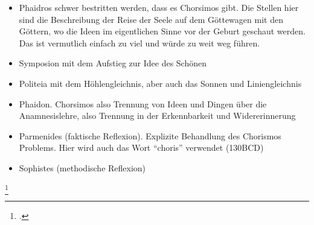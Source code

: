 \documentclass[12pt]{article}
\begin{document}
\begin{itemize}
    \item {Phaidros schwer bestritten werden, dass es Chorsimos gibt. Die Stellen hier sind die Beschreibung der Reise der Seele auf dem Göttewagen mit den Göttern, wo die Ideen im eigentlichen Sinne vor der Geburt geschaut werden. Das ist vermutlich einfach zu viel und würde zu weit weg führen.}
    \item {Symposion mit dem Aufstieg zur Idee des Schönen}
    \item {Politeia mit dem Höhlengleichnis, aber auch das Sonnen und Liniengleichnis}
    \item {Phaidon. Chorsimos also Trennung von Ideen und Dingen über die Anamnesislehre, also Trennung in der Erkennbarkeit und Widererinnerung}
    \item {Parmenides (faktische Reflexion). Explizite Behandlung des Chorismos Problems. Hier wird auch das Wort \enquote{choris} verwendet (130BCD)}
    \item {Sophistes (methodische Reflexion)}
\end{itemize}
\footcite[vgl.][S. 160]{Martin73}
\end{document}
